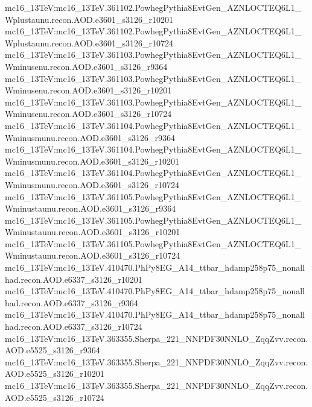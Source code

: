 { mc16\_13TeV:mc16\_13TeV.361102.PowhegPythia8EvtGen\_AZNLOCTEQ6L1\_Wplustaunu.recon.AOD.e3601\_s3126\_r10201\newline    
 mc16\_13TeV:mc16\_13TeV.361102.PowhegPythia8EvtGen\_AZNLOCTEQ6L1\_Wplustaunu.recon.AOD.e3601\_s3126\_r10724\newline    
 mc16\_13TeV:mc16\_13TeV.361103.PowhegPythia8EvtGen\_AZNLOCTEQ6L1\_Wminusenu.recon.AOD.e3601\_s3126\_r9364\newline    
 mc16\_13TeV:mc16\_13TeV.361103.PowhegPythia8EvtGen\_AZNLOCTEQ6L1\_Wminusenu.recon.AOD.e3601\_s3126\_r10201\newline    
 mc16\_13TeV:mc16\_13TeV.361103.PowhegPythia8EvtGen\_AZNLOCTEQ6L1\_Wminusenu.recon.AOD.e3601\_s3126\_r10724\newline    
 mc16\_13TeV:mc16\_13TeV.361104.PowhegPythia8EvtGen\_AZNLOCTEQ6L1\_Wminusmunu.recon.AOD.e3601\_s3126\_r9364\newline    
 mc16\_13TeV:mc16\_13TeV.361104.PowhegPythia8EvtGen\_AZNLOCTEQ6L1\_Wminusmunu.recon.AOD.e3601\_s3126\_r10201\newline    
 mc16\_13TeV:mc16\_13TeV.361104.PowhegPythia8EvtGen\_AZNLOCTEQ6L1\_Wminusmunu.recon.AOD.e3601\_s3126\_r10724\newline    
 mc16\_13TeV:mc16\_13TeV.361105.PowhegPythia8EvtGen\_AZNLOCTEQ6L1\_Wminustaunu.recon.AOD.e3601\_s3126\_r9364\newline    
 mc16\_13TeV:mc16\_13TeV.361105.PowhegPythia8EvtGen\_AZNLOCTEQ6L1\_Wminustaunu.recon.AOD.e3601\_s3126\_r10201\newline    
 mc16\_13TeV:mc16\_13TeV.361105.PowhegPythia8EvtGen\_AZNLOCTEQ6L1\_Wminustaunu.recon.AOD.e3601\_s3126\_r10724\newline    
 mc16\_13TeV:mc16\_13TeV.410470.PhPy8EG\_A14\_ttbar\_hdamp258p75\_nonallhad.recon.AOD.e6337\_s3126\_r10201\newline    
 mc16\_13TeV:mc16\_13TeV.410470.PhPy8EG\_A14\_ttbar\_hdamp258p75\_nonallhad.recon.AOD.e6337\_s3126\_r9364\newline    
 mc16\_13TeV:mc16\_13TeV.410470.PhPy8EG\_A14\_ttbar\_hdamp258p75\_nonallhad.recon.AOD.e6337\_s3126\_r10724\newline    
 mc16\_13TeV:mc16\_13TeV.363355.Sherpa\_221\_NNPDF30NNLO\_ZqqZvv.recon.AOD.e5525\_s3126\_r9364\newline    
 mc16\_13TeV:mc16\_13TeV.363355.Sherpa\_221\_NNPDF30NNLO\_ZqqZvv.recon.AOD.e5525\_s3126\_r10201\newline    
 mc16\_13TeV:mc16\_13TeV.363355.Sherpa\_221\_NNPDF30NNLO\_ZqqZvv.recon.AOD.e5525\_s3126\_r10724\newline    
}
